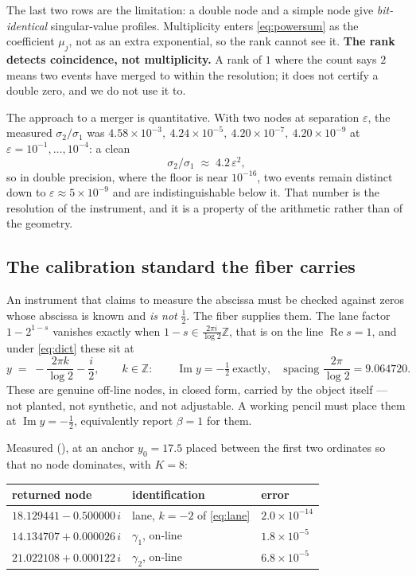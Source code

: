 \documentclass[11pt]{article}
\theoremstyle{plain}
\theoremstyle{definition}
\theoremstyle{remark}
\newcommand{\Z}{\mathbb{Z}}
\newcommand{\lean}[1]{\texttt{\detokenize{#1}}}
\begin{document}
\noindent
The last two rows are the limitation: a double node and a simple node give
\emph{bit-identical} singular-value profiles. Multiplicity enters \eqref{eq:powersum}
as the coefficient $\mu_j$, not as an extra exponential, so the rank cannot see it.
\textbf{The rank detects coincidence, not multiplicity.} A rank of $1$ where the count
says $2$ means two events have merged to within the resolution; it does not certify a
double zero, and we do not use it to.

The approach to a merger is quantitative. With two nodes at separation $\varepsilon$,
the measured $\sigma_2/\sigma_1$ was $4.58\times10^{-3},\ 4.24\times10^{-5},\
4.20\times10^{-7},\ 4.20\times10^{-9}$ at $\varepsilon=10^{-1},\dots,10^{-4}$: a clean
\[
  \sigma_2/\sigma_1\;\approx\;4.2\,\varepsilon^{2},
\]
so in double precision, where the floor is near $10^{-16}$, two events remain distinct
down to $\varepsilon\approx5\times10^{-9}$ and are indistinguishable below it. That
number is the resolution of the instrument, and it is a property of the arithmetic
rather than of the geometry.

\subsection{The calibration standard the fiber carries}\label{sec:lanecontrol}
An instrument that claims to measure the abscissa must be checked against zeros whose
abscissa is known and \emph{is not} $\tfrac12$. The fiber supplies them. The lane
factor $1-2^{1-s}$ vanishes exactly when $1-s\in\frac{2\pi i}{\log2}\Z$, that is on the
line $\operatorname{Re}s=1$, and under \eqref{eq:dict} these sit at
\begin{equation}\label{eq:lane}
  y\;=\;-\frac{2\pi k}{\log 2}-\frac{i}{2},\qquad k\in\Z:
  \qquad \operatorname{Im}y=-\tfrac12\ \text{exactly},\quad
  \text{spacing } \frac{2\pi}{\log2}=9.064720 .
\end{equation}
These are genuine off-line nodes, in closed form, carried by the object itself --- not
planted, not synthetic, and not adjustable. A working pencil must place them at
$\operatorname{Im}y=-\tfrac12$, equivalently report $\beta=1$ for them.

Measured (\lean{extractor/checks/pencil_lane_control.py}), at an anchor $y_0=17.5$
placed between the first two ordinates so that no node dominates, with $K=8$:

\begin{center}
\begin{tabular}{lll}
\toprule
returned node & identification & error\\
\midrule
$18.129441-0.500000\,i$ & lane, $k=-2$ of \eqref{eq:lane} & $2.0\times10^{-14}$\\
$14.134707+0.000026\,i$ & $\gamma_1$, on-line & $1.8\times10^{-5}$\\
$21.022108+0.000122\,i$ & $\gamma_2$, on-line & $6.8\times10^{-5}$\\
\bottomrule
\end{tabular}
\end{center}
\end{document}
